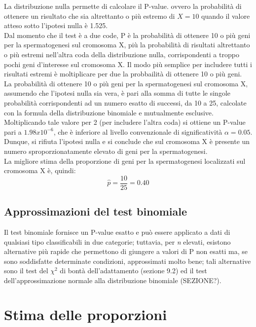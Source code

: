 \documentclass[10pt, draft]{book}
\newcounter{example}[section]
\begin{document}
\begin{example}
    La distribuzione nulla permette di calcolare il P-value. ovvero la probabilità di ottenere un risultato che sia altrettanto o più estremo di $X = 10$ quando il valore atteso sotto l'ipotesi nulla è 1.525.
    \\
    Dal momento che il test è a due code, P è la probabilità di ottenere 10 o più geni per la spermatogenesi sul cromosoma X, più la probabilità di risultati altrettanto o più estremi nell'altra coda della distribuzione nulla, corrispondenti a troppo pochi geni d'interesse sul cromosoma X. Il modo più semplice per includere tutti i risultati estremi è moltiplicare per due la probbailità di ottenere 10 o più geni.
    \\
    La probabilità di ottenere 10 o più geni per la spermatogenesi sul cromosoma X, assumendo che l'ipotesi nulla sia vera, è pari alla somma di tutte le singole probabilità corrispondenti ad un numero esatto di successi, da 10 a 25, calcolate con la formula della distribuzione binomiale e mutualmente esclusive. Moltiplicando tale valore per 2 (per includere l'altra coda) si ottiene un P-value pari a $1.98 x 10^{-6}$, che è inferiore al livello convenzionale di significatività $\alpha = 0.05$. Dunque, si rifiuta l'ipotesi nulla e si conclude che sul cromosoma X è presente un numero sproporzionatamente elevato di geni per la spermatogenesi.
    \\
    La migliore stima della proporzione di geni per la spermatogenesi localizzati sul cromosoma X è, quindi:
    \begin{equation}
    \hat{p} = \frac{10}{25} = 0.40
    \end{equation}
\end{example}

\subsection{Approssimazioni del test binomiale}
Il test binomiale fornisce un P-value esatto e può essere applicato a dati di qualsiasi tipo classificabili in due categorie; tuttavia, per \textit{n} elevati, esistono alternative più rapide che permettono di giungere a valori di P non esatti ma, se sono soddisfatte determinate condizioni, approssimati molto bene; tali alternative sono il test del $\chi^2$ di bontà dell'adattamento (sezione 9.2) ed il test dell'approssimazione normale alla distribuzione binomiale (SEZIONE?).

\section{Stima delle proporzioni}
\end{document}
